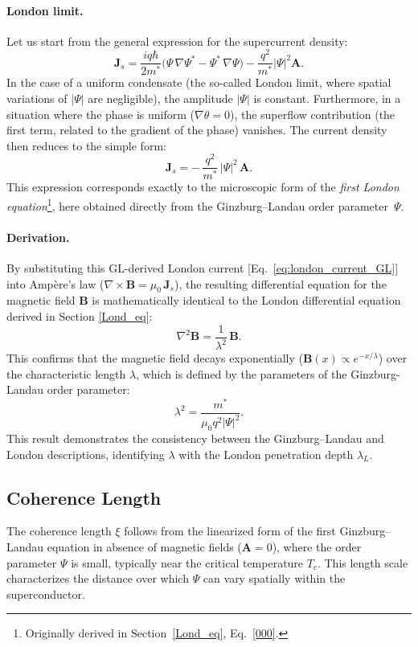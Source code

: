 \paragraph{London limit.}
Let us start from the general expression for the supercurrent density:
\[
\mathbf{J}_s =
\frac{i q \hbar}{2 m^*}
\bigl(\Psi\,\nabla\Psi^* - \Psi^*\,\nabla\Psi\bigr)
- \frac{q^2}{m^*}|\Psi|^2\mathbf{A}.
\]
In the case of a uniform condensate (the so-called London limit, where spatial variations of $|\Psi|$ are negligible), the amplitude $|\Psi|$ is constant. Furthermore, in a situation where the phase is uniform ($\nabla\theta = 0$), the superflow contribution (the first term, related to the gradient of the phase) vanishes. The current density then reduces to the simple form:
\begin{equation}
\mathbf{J}_s = -\,\frac{q^2}{m^*}\,|\Psi|^2\,\mathbf{A}.
\label{eq:london_current_GL}
\end{equation}
This expression corresponds exactly to the microscopic form of the \textit{first London equation}\footnote{%
Originally derived in Section~\ref{Lond_eq}, Eq.~\eqref{000}.},
here obtained directly from the Ginzburg--Landau order parameter~$\Psi$.

\paragraph{Derivation.}
By substituting this GL-derived London current [Eq.~\eqref{eq:london_current_GL}] into Ampère’s law ($\nabla\times\mathbf{B} = \mu_0\,\mathbf{J}_s$), the resulting differential equation for the magnetic field $\mathbf{B}$ is mathematically identical to the London differential equation derived in Section \ref{Lond_eq}:
\begin{equation}
\nabla^2\mathbf{B}
= \frac{1}{\lambda^2}\,\mathbf{B}.
\label{eq:GL_london_equation}
\end{equation}
This confirms that the magnetic field decays exponentially ($\mathbf{B}(x) \propto e^{-x/\lambda}$) over the characteristic length $\lambda$, which is defined by the parameters of the Ginzburg-Landau order parameter:
\begin{equation}
\boxed{
\lambda^2 = \frac{m^*}{\mu_0 q^2 |\Psi|^2}.
}
\label{eq:penetration_depth_GL}
\end{equation}
This result demonstrates the consistency between the Ginzburg–Landau and London descriptions, identifying $\lambda$ with the London penetration depth $\lambda_L$.

\subsection*{Coherence Length}
The coherence length $\xi$ follows from the linearized form of the first Ginzburg–Landau equation in absence of magnetic fields ($\mathbf A=0$), where the order parameter $\Psi$ is small, typically near the critical temperature $T_c$. This length scale characterizes the distance over which $\Psi$ can vary spatially within the superconductor.

